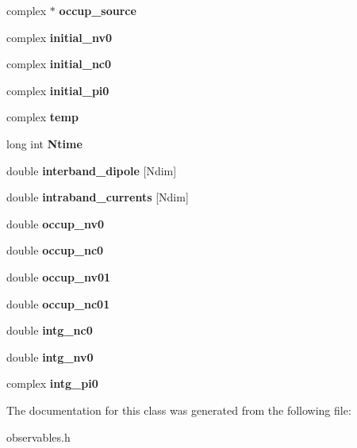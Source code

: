 \begin{DoxyCompactItemize}
complex $\ast$ {\bfseries occup\+\_\+source}
\item 
\mbox{\label{classobservables_adac45a0b3b4774b0640df3157c5da264}} 
complex {\bfseries initial\+\_\+nv0}
\item 
\mbox{\label{classobservables_a78e63c38dddbeefbe956fccc63fed2fa}} 
complex {\bfseries initial\+\_\+nc0}
\item 
\mbox{\label{classobservables_a0152e42693904e009d70ea409b4b1789}} 
complex {\bfseries initial\+\_\+pi0}
\item 
\mbox{\label{classobservables_ae123fba0388e7ca2bf4a8fb6ea4605eb}} 
complex {\bfseries temp}
\item 
\mbox{\label{classobservables_ada144bb15c79ad0f01bd0912e1defb5f}} 
long int {\bfseries Ntime}
\item 
\mbox{\label{classobservables_abb0cd872fc67de32282614fadb182f02}} 
double {\bfseries interband\+\_\+dipole} \mbox{[}Ndim\mbox{]}
\item 
\mbox{\label{classobservables_aa6622fbd0f1e8a532e3d4531e3b66eea}} 
double {\bfseries intraband\+\_\+currents} \mbox{[}Ndim\mbox{]}
\item 
\mbox{\label{classobservables_adfc73aed1b293ce1961586e4c5090d95}} 
double {\bfseries occup\+\_\+nv0}
\item 
\mbox{\label{classobservables_ad22342146e9a0a288b7247cdc9468f8c}} 
double {\bfseries occup\+\_\+nc0}
\item 
\mbox{\label{classobservables_af0d8aafa849af6ffb56d7d2ec880a5b0}} 
double {\bfseries occup\+\_\+nv01}
\item 
\mbox{\label{classobservables_a0816719c5410643e2ba7314adce45b01}} 
double {\bfseries occup\+\_\+nc01}
\item 
\mbox{\label{classobservables_a9d607bbfbb4ce74be133893df1bcd18f}} 
double {\bfseries intg\+\_\+nc0}
\item 
\mbox{\label{classobservables_a279d8bd321c37a456f961983653d4937}} 
double {\bfseries intg\+\_\+nv0}
\item 
\mbox{\label{classobservables_a3c95ce1e5fc4a604fca148986fdabe4f}} 
complex {\bfseries intg\+\_\+pi0}
\end{DoxyCompactItemize}


The documentation for this class was generated from the following file\+:\begin{DoxyCompactItemize}
\item 
observables.\+h\end{DoxyCompactItemize}
